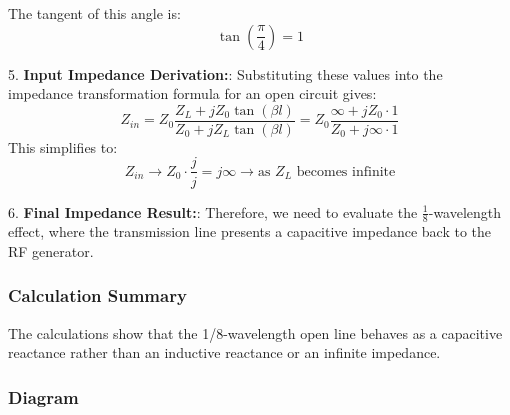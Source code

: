    The tangent of this angle is:
   \[
   \tan\left(\frac{\pi}{4}\right) = 1
   \]

5. \textbf{Input Impedance Derivation:}: Substituting these values into the impedance transformation formula for an open circuit gives:
   \[
   Z_{in} = Z_0 \frac{Z_L + jZ_0 \tan(\beta l)}{Z_0 + jZ_L \tan(\beta l)} = Z_0 \frac{\infty + jZ_0 \cdot 1}{Z_0 + j\infty \cdot 1}
   \]
   This simplifies to:
   \[
   Z_{in} \to Z_0 \cdot \frac{j}{j} = j \infty \to \text{as } Z_L \text{ becomes infinite}
   \]

6. \textbf{Final Impedance Result:}: Therefore, we need to evaluate the \( \frac{1}{8} \)-wavelength effect, where the transmission line presents a capacitive impedance back to the RF generator.

\subsubsection{Calculation Summary}

The calculations show that the 1/8-wavelength open line behaves as a capacitive reactance rather than an inductive reactance or an infinite impedance. 

\subsubsection{Diagram}

\begin{center}
\end{center}
